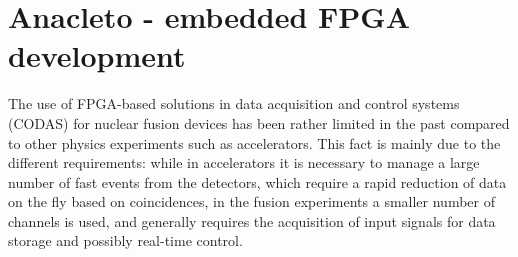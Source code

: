 



\section{Anacleto - embedded FPGA development}

The use of FPGA-based solutions in data acquisition and control systems (CODAS) for nuclear fusion devices has been rather limited in the past compared to other physics experiments such as accelerators. This fact is mainly due to the different requirements: while in accelerators it is necessary to manage a large number of fast events from the detectors, which require a rapid reduction of data on the fly based on coincidences, in the fusion experiments a smaller number of channels is used, and generally requires the acquisition of input signals for data storage and possibly real-time control. 
